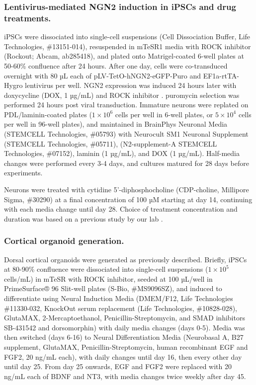 \subsubsection{Lentivirus-mediated NGN2 induction in iPSCs and drug treatments.}
iPSCs were dissociated into single-cell suspensions (Cell Dissociation Buffer, Life Technologies, \#13151-014), resuspended in mTeSR1 media with ROCK inhibitor (Rockout; Abcam, ab285418), and plated onto Matrigel-coated 6-well plates at 50-60\% confluence after 24 hours. After one day, cells were co-transduced overnight with 80 µL each of pLV-TetO-hNGN2-eGFP-Puro and EF1a-rtTA-Hygro lentivirus per well. NGN2 expression was induced 24 hours later with doxycycline (DOX, 1 µg/mL) and ROCK inhibitor . puromycin selection was performed 24 hours post viral transduction. Immature neurons were replated on PDL/laminin-coated plates ($1 \times 10^6$ cells per well in 6-well plates, or $5 \times 10^4$ cells per well in 96-well plates), and maintained in BrainPhys Neuronal Media (STEMCELL Technologies, \#05793) with Neurocult SM1 Neuronal Supplement (STEMCELL Technologies, \#05711), (N2-supplement-A STEMCELL Technologies, \#07152), laminin (1 µg/mL), and DOX (1 µg/mL). Half-media changes were performed every 3-4 days, and cultures matured for 28 days before experiments.

Neurons were treated with cytidine 5'-diphosphocholine (CDP-choline, Millipore Sigma, \#30290) at a final concentration of 100 µM starting at day 14, continuing with each media change until day 28. Choice of treatment concentration and duration was based on a previous study by our lab \supercite{Sienski2021-zt}.

\subsubsection{Cortical organoid generation.}
Dorsal cortical organoids were generated as previously described\supercite{Sloan2018-ja}. Briefly, iPSCs at 80-90\% confluence were dissociated into single-cell suspensions ($1 \times 10^5$ cells/mL) in mTeSR with ROCK inhibitor, seeded at 100 µL/well in PrimeSurface® 96 Slit-well plates (S-Bio, \#MS9096SZ), and induced to differentiate using Neural Induction Media (DMEM/F12, Life Technologies \#11330-032, KnockOut serum replacement (Life Technologies, \#10828-028), GlutaMAX, 2-Mercaptoethanol, Penicillin-Streptomycin, and SMAD inhibitors SB-431542 and dorsomorphin) with daily media changes (days 0-5). Media was then switched (days 6-16) to Neural Differentiation Media (Neurobasal A, B27 supplement, GlutaMAX, Penicillin-Streptomycin, human recombinant EGF and FGF2, 20 ng/mL each), with daily changes until day 16, then every other day until day 25. From day 25 onwards, EGF and FGF2 were replaced with 20 ng/mL each of BDNF and NT3, with media changes twice weekly after day 45.

